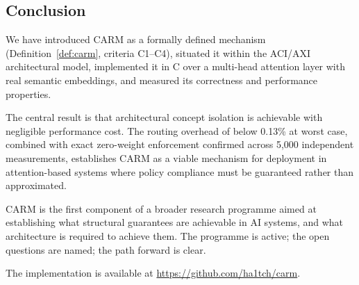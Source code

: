 \documentclass[11pt,a4paper]{article}
\theoremstyle{definition}
\begin{document}
\subsection{Conclusion}

We have introduced CARM as a formally defined mechanism
(Definition~\ref{def:carm}, criteria C1--C4), situated it within the ACI/AXI
architectural model, implemented it in C over a multi-head attention layer
with real semantic embeddings, and measured its correctness and performance
properties.

The central result is that architectural concept isolation is achievable with
negligible performance cost. The routing overhead of below 0.13\% at worst
case, combined with exact zero-weight enforcement confirmed across 5,000
independent measurements, establishes CARM as a viable mechanism for
deployment in attention-based systems where policy compliance must be
guaranteed rather than approximated.

CARM is the first component of a broader research programme aimed at
establishing what structural guarantees are achievable in AI systems, and
what architecture is required to achieve them. The programme is active; the
open questions are named; the path forward is clear.

The implementation is available at \url{https://github.com/ha1tch/carm}.

\end{document}
